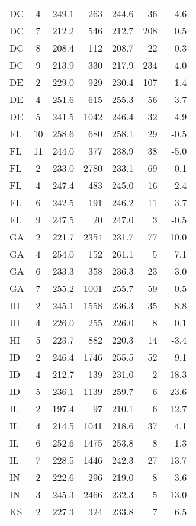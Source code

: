 \begin{longtable}{lcrr@{\extracolsep{10pt}}rr@{\extracolsep{10pt}}r}
  DC & 4 & 249.1 & 263 & 244.6 & 36 & -4.6 \\ 
  DC & 7 & 212.2 & 546 & 212.7 & 208 & 0.5 \\ 
  DC & 8 & 208.4 & 112 & 208.7 & 22 & 0.3 \\ 
  DC & 9 & 213.9 & 330 & 217.9 & 234 & 4.0 \\ 
  DE & 2 & 229.0 & 929 & 230.4 & 107 & 1.4 \\ 
  DE & 4 & 251.6 & 615 & 255.3 & 56 & 3.7 \\ 
  DE & 5 & 241.5 & 1042 & 246.4 & 32 & 4.9 \\ 
  FL & 10 & 258.6 & 680 & 258.1 & 29 & -0.5 \\ 
  FL & 11 & 244.0 & 377 & 238.9 & 38 & -5.0 \\ 
  FL & 2 & 233.0 & 2780 & 233.1 & 69 & 0.1 \\ 
  FL & 4 & 247.4 & 483 & 245.0 & 16 & -2.4 \\ 
  FL & 6 & 242.5 & 191 & 246.2 & 11 & 3.7 \\ 
  FL & 9 & 247.5 & 20 & 247.0 &  3 & -0.5 \\ 
  GA & 2 & 221.7 & 2354 & 231.7 & 77 & 10.0 \\ 
  GA & 4 & 254.0 & 152 & 261.1 &  5 & 7.1 \\ 
  GA & 6 & 233.3 & 358 & 236.3 & 23 & 3.0 \\ 
  GA & 7 & 255.2 & 1001 & 255.7 & 59 & 0.5 \\ 
  HI & 2 & 245.1 & 1558 & 236.3 & 35 & -8.8 \\ 
  HI & 4 & 226.0 & 255 & 226.0 &  8 & 0.1 \\ 
  HI & 5 & 223.7 & 882 & 220.3 & 14 & -3.4 \\ 
  ID & 2 & 246.4 & 1746 & 255.5 & 52 & 9.1 \\ 
  ID & 4 & 212.7 & 139 & 231.0 &  2 & 18.3 \\ 
  ID & 5 & 236.1 & 1139 & 259.7 &  6 & 23.6 \\ 
  IL & 2 & 197.4 & 97 & 210.1 &  6 & 12.7 \\ 
  IL & 4 & 214.5 & 1041 & 218.6 & 37 & 4.1 \\ 
  IL & 6 & 252.6 & 1475 & 253.8 &  8 & 1.3 \\ 
  IL & 7 & 228.5 & 1446 & 242.3 & 27 & 13.7 \\ 
  IN & 2 & 222.6 & 296 & 219.0 &  8 & -3.6 \\ 
  IN & 3 & 245.3 & 2466 & 232.3 &  5 & -13.0 \\ 
  KS & 2 & 227.3 & 324 & 233.8 &  7 & 6.5 \\ 

\end{longtable}
